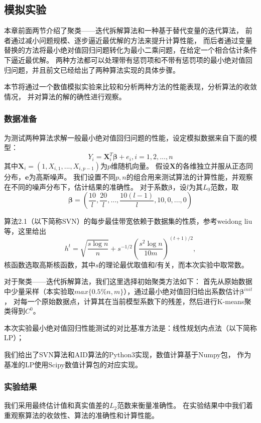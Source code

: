 \subsection{模拟实验}
本章前面两节介绍了聚类——迭代拆解算法和一种基于替代变量的迭代算法，
前者通过减小问题规模、逐步逼近最优解的方法来提升计算性能，
而后者通过变量替换的方法将最小绝对值回归问题转化为最小二乘问题，在给定一个相合估计条件下逼近最优解。
两种方法都可以处理带有惩罚项和不带有惩罚项的最小绝对值回归问题，并且前文已经给出了两种算法实现的具体步骤。

本节将通过一个数值模拟实验来比较和分析两种方法的性能表现，分析算法的收敛情况，
并对算法的解的确性进行观察。

\subsubsection{数据准备}
为测试两种算法求解一般最小绝对值回归问题的性能，设定模拟数据来自下面的模型：
\begin{equation*}
    {Y}_i = \bm{X}_i^T \bm{\beta} + e_i, i = 1, 2, ..., n
\end{equation*}
其中$\bm{X}_i = (1, X_{i,1}, ..., X_{i, p-1})$为$p$维随机向量。
假设$\bm{X}$的各维独立并服从正态同分布，$\bm{e}$为高斯噪声。
我们设置不同$p, n$的组合用来测试算法的计算性能，并观察在不同的噪声分布下，估计结果的准确性。
对于系数$\bm{\beta}$，设$l$为其$L_0$范数，取
$$
    \bm{\beta} = (\frac{10}{l}, \frac{20}{l}, ..., \frac{10(l-1)}{l}, 10, 0, ..., 0)
$$

算法2.1（以下简称SVN）的每步最佳带宽依赖于数据集的性质，参考weidong liu等，这里给出
$$
    h^t = \sqrt{\frac{s\log n}{n}} + s^{-1/2} (\frac{s^2\log n}{10m})^{(t+1)/2},
$$
核函数选取高斯核函数，其中$s$的理论最优取值和$l$有关，而本次实验中取常数。

对于聚类——迭代拆解算法，我们这里选择初始聚类方法如下：
首先从原始数据中少量采样（本实验取$max\{0.5\%n, m\}$），通过最小绝对值回归给出系数估计$\bm{\beta}^{init}$，
对每一个原始数据点，计算其在当前模型系数下的残差，然后进行K-means聚类得到$C^0$。

本次实验最小绝对值回归性能测试的对比基准方法是：线性规划内点法（以下简称LP）；

我们给出了SVN算法和AID算法的Python3实现，数值计算基于Numpy包，
作为基准的LP使用Scipy数值计算包的对应实现。

\subsubsection{实验结果}
我们采用最终估计值和真实值差的$L_2$范数来衡量准确性。
在实验结果中中我们着重观察算法的收敛性、算法的准确性和计算性能。

